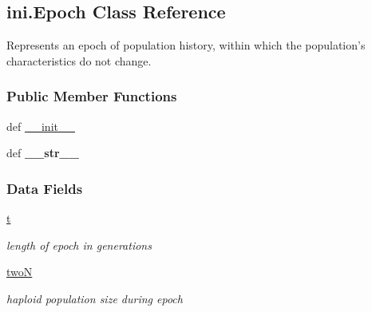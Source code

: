 \hypertarget{classini_1_1_epoch}{\subsection{ini.\-Epoch \-Class \-Reference}
\label{classini_1_1_epoch}
}


\-Represents an epoch of population history, within which the population's characteristics do not change.  


\subsubsection*{\-Public \-Member \-Functions}
\begin{DoxyCompactItemize}
\item 
def \hyperlink{classini_1_1_epoch_aab954d54f8c04e76dd169b4dcb27fefd}{\-\_\-\-\_\-init\-\_\-\-\_\-}
\item 
\hypertarget{classini_1_1_epoch_a18068a5b112c76122d491002f0b44964}{def {\bfseries \-\_\-\-\_\-str\-\_\-\-\_\-}}\label{classini_1_1_epoch_a18068a5b112c76122d491002f0b44964}

\end{DoxyCompactItemize}
\subsubsection*{\-Data \-Fields}
\begin{DoxyCompactItemize}
\item 
\hypertarget{classini_1_1_epoch_a603d7e2b4339acbea9d033d7ee52d0a6}{\hyperlink{classini_1_1_epoch_a603d7e2b4339acbea9d033d7ee52d0a6}{t}}\label{classini_1_1_epoch_a603d7e2b4339acbea9d033d7ee52d0a6}

\begin{DoxyCompactList}\small\item\em length of epoch in generations \end{DoxyCompactList}\item 
\hypertarget{classini_1_1_epoch_ada6346e6a8ebbd2277f593dfc9a3e20d}{\hyperlink{classini_1_1_epoch_ada6346e6a8ebbd2277f593dfc9a3e20d}{two\-N}}\label{classini_1_1_epoch_ada6346e6a8ebbd2277f593dfc9a3e20d}

\begin{DoxyCompactList}\small\item\em haploid population size during epoch \end{DoxyCompactList}\end{DoxyCompactItemize}


